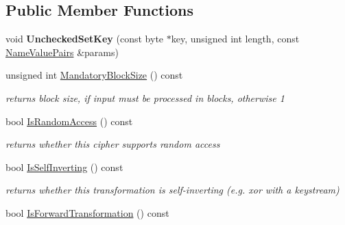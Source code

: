 \subsection*{Public Member Functions}
\begin{DoxyCompactItemize}
\item 
\hypertarget{class_block_oriented_cipher_mode_base_a1d095f1ee08abb9f03f0ed16a32c6b04}{
void {\bfseries UncheckedSetKey} (const byte $\ast$key, unsigned int length, const \hyperlink{class_name_value_pairs}{NameValuePairs} \&params)}
\label{class_block_oriented_cipher_mode_base_a1d095f1ee08abb9f03f0ed16a32c6b04}

\item 
\hypertarget{class_block_oriented_cipher_mode_base_a2fa0c0eb71891b60825c4d9a9723f7a1}{
unsigned int \hyperlink{class_block_oriented_cipher_mode_base_a2fa0c0eb71891b60825c4d9a9723f7a1}{MandatoryBlockSize} () const }
\label{class_block_oriented_cipher_mode_base_a2fa0c0eb71891b60825c4d9a9723f7a1}

\begin{DoxyCompactList}\small\item\em returns block size, if input must be processed in blocks, otherwise 1 \item\end{DoxyCompactList}\item 
\hypertarget{class_block_oriented_cipher_mode_base_a39291edcd523e1a8b1d3a8b6e3098438}{
bool \hyperlink{class_block_oriented_cipher_mode_base_a39291edcd523e1a8b1d3a8b6e3098438}{IsRandomAccess} () const }
\label{class_block_oriented_cipher_mode_base_a39291edcd523e1a8b1d3a8b6e3098438}

\begin{DoxyCompactList}\small\item\em returns whether this cipher supports random access \item\end{DoxyCompactList}\item 
\hypertarget{class_block_oriented_cipher_mode_base_a332d8dd09adc7a41328d172af05f14db}{
bool \hyperlink{class_block_oriented_cipher_mode_base_a332d8dd09adc7a41328d172af05f14db}{IsSelfInverting} () const }
\label{class_block_oriented_cipher_mode_base_a332d8dd09adc7a41328d172af05f14db}

\begin{DoxyCompactList}\small\item\em returns whether this transformation is self-\/inverting (e.g. xor with a keystream) \item\end{DoxyCompactList}\item 
\hypertarget{class_block_oriented_cipher_mode_base_ac15b9fafc77eb254d6167524452ecbce}{
bool \hyperlink{class_block_oriented_cipher_mode_base_ac15b9fafc77eb254d6167524452ecbce}{IsForwardTransformation} () const }
\label{class_block_oriented_cipher_mode_base_ac15b9fafc77eb254d6167524452ecbce}


\end{DoxyCompactItemize}
